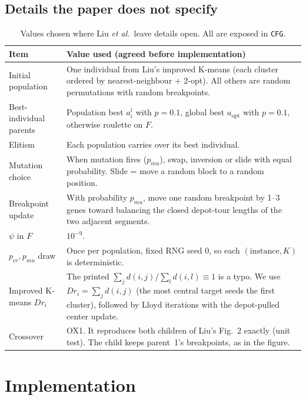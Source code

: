 \documentclass[10pt,a4paper]{article}
\begin{document}
\subsection{Details the paper does not specify}
\begin{table}[H]\centering\small
\begin{tabularx}{\linewidth}{>{\raggedright\arraybackslash}p{4.6cm}L}
\toprule
Item & Value used (agreed before implementation)\\
\midrule
Initial population & One individual from Liu's improved K-means (each cluster ordered by nearest-neighbour + 2-opt). All others are random permutations with random breakpoints.\\
Best-individual parents & Population best $a_i^l$ with $p=0.1$, global best $a_{\mathrm{opt}}$ with $p=0.1$, otherwise roulette on $F$.\\
Elitism & Each population carries over its best individual.\\
Mutation choice & When mutation fires ($p_{mu}$), swap, inversion or slide with equal probability. Slide = move a random block to a random position.\\
Breakpoint update & With probability $p_{mu}$, move one random breakpoint by 1--3 genes toward balancing the closed depot-tour lengths of the two adjacent segments.\\
$\psi$ in $F$ & $10^{-9}$.\\
$p_{cr},p_{mu}$ draw & Once per population, fixed RNG seed 0, so each $(\text{instance},K)$ is deterministic.\\
Improved K-means $Dr_i$ & The printed $\sum_j d(i,j)/\sum_l d(i,l)\equiv 1$ is a typo. We use $Dr_i=\sum_j d(i,j)$ (the most central target seeds the first cluster), followed by Lloyd iterations with the depot-pulled center update.\\
Crossover & OX1. It reproduces both children of Liu's Fig.~2 exactly (unit test). The child keeps parent~1's breakpoints, as in the figure.\\
\bottomrule
\end{tabularx}
\caption{Values chosen where Liu \emph{et al.}\ leave details open. All are exposed in \texttt{CFG}.}
\end{table}

\section{Implementation}
\end{document}
